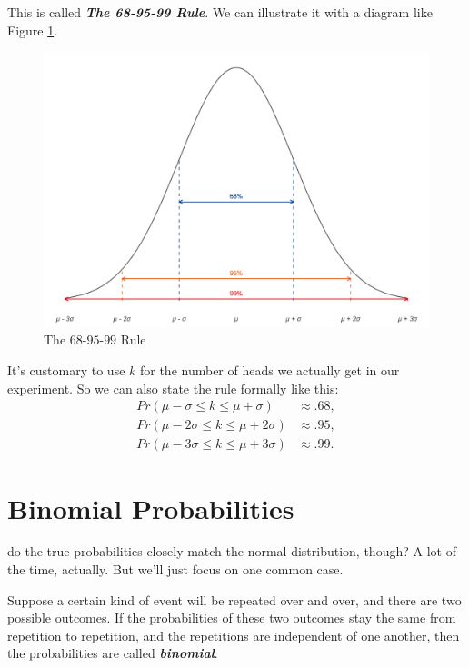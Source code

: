 \documentclass[justified]{tufte-book}
\newcommand{\p}{Pr}
\theoremstyle{definition}
\theoremstyle{definition}
\theoremstyle{definition}
\theoremstyle{remark}
\begin{document}
This is called \textbf{\emph{The 68-95-99 Rule}}. We can illustrate it
with a diagram like Figure \ref{fig:snnrule}.

\begin{figure}
\includegraphics{_main_files/figure-latex/snnrule-1} \caption[The $68$-$95$-$99$ Rule]{The $68$-$95$-$99$ Rule}\label{fig:snnrule}
\end{figure}

It's customary to use \(k\) for the number of heads we actually get in
our experiment. So we can also state the rule formally like this: \[
  \begin{aligned}
    \p(\mu - \sigma \leq k \leq \mu + \sigma) &\approx .68,\\
    \p(\mu - 2\sigma \leq k \leq \mu + 2\sigma) &\approx .95,\\
    \p(\mu - 3\sigma \leq k \leq \mu + 3\sigma) &\approx .99.
  \end{aligned}
\]

\hypertarget{binomial-probabilities}{%
\section{Binomial Probabilities}\label{binomial-probabilities}}

 do the true probabilities closely match the normal
distribution, though? A lot of the time, actually. But we'll just focus
on one common case.

Suppose a certain kind of event will be repeated over and over, and
there are two possible outcomes. If the probabilities of these two
outcomes stay the same from repetition to repetition, and the
repetitions are independent of one another, then the probabilities are
called \textbf{\emph{binomial}}.
\end{document}
